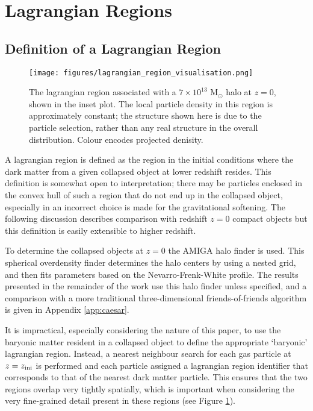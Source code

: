\section{Lagrangian Regions}

\subsection{Definition of a Lagrangian Region}

\begin{figure}
    \centering
    \texttt{[image: figures/lagrangian\_region\_visualisation.png]}
    \caption{The lagrangian region associated with a $7\times10^{13}$ $\mathrm{M}_\odot$ halo at $z=0$, shown in the inset plot. The local particle density in this region is approximately constant; the structure shown here is due to the particle selection, rather than any real structure in the overall distribution. Colour encodes projected denisity.}
    \label{fig:lrpic}
\end{figure}

A lagrangian region is defined as the region in the initial conditions where the dark matter from a given collapsed object at lower redshift resides. This definition is somewhat open to interpretation; there may be particles enclosed in the convex hull of such a region that do not end up in the collapsed object, especially in an incorrect choice is made for the gravitational softening. The following discussion describes comparison with redshift $z=0$ compact objects but this definition is easily extensible to higher redshift.

To determine the collapsed objects at $z=0$ the AMIGA halo finder \citep[AHF][]{ahf_refernces} is used. This spherical overdensity finder determines the halo centers by using a nested grid, and then fits parameters based on the Nevarro-Frenk-White \citep[NFW, ][]{nfw_ref} profile. The results presented in the remainder of the work use this halo finder unless specified, and a comparison with a more traditional three-dimensional friends-of-friends algorithm is given in Appendix \ref{app:caesar}.

It is impractical, especially considering the nature of this paper, to use the baryonic matter resident in a collapsed object to define the appropriate `baryonic' lagrangian region. Instead, a nearest neighbour search for each gas particle at $z=z_{\rm ini}$ is performed and each particle assigned a lagrangian region identifier that corresponds to that of the nearest dark matter particle. This ensures that the two regions overlap very tightly spatially, which is important when considering the very fine-grained detail present in these regions (see Figure \ref{fig:lrpic}).


